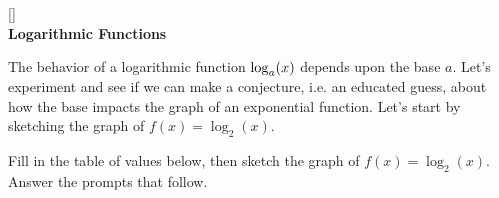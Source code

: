 \documentclass[10pt]{article}
\begin{document}
~\\\\
[]{
{\bf {}} 
}{
{\bf {}}
}
\\
\newpage
{\bf Logarithmic Functions}

The behavior of a logarithmic function $\displaystyle \log_a(x)$  depends upon  the base $a$. Let's experiment and see if we can make a conjecture, i.e. an educated guess, about how the base impacts the graph of an exponential function. Let's start by sketching the graph of $f(x)=\log_2(x)$.

 Fill in the table of values below, then sketch the graph of $f(x)=\log_2(x)$. Answer the prompts that follow.
\end{document}
